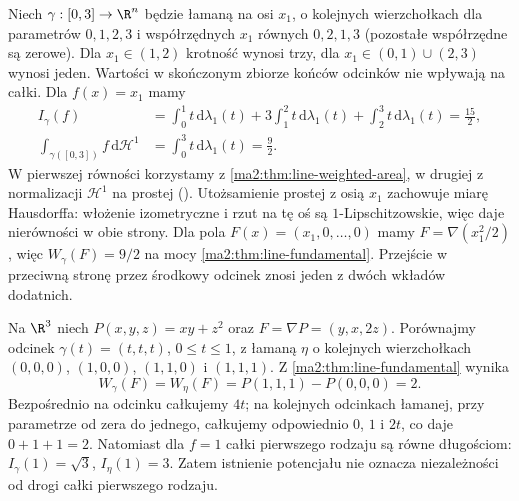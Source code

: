 \begin{przyklad}
\label{ma2:ex:line-partial-repetition}
Niech $\gamma:[0,3]\to\R^n$ będzie łamaną na osi $x_1$,
o kolejnych wierzchołkach dla parametrów $0,1,2,3$
i współrzędnych $x_1$ równych $0,2,1,3$
(pozostałe współrzędne są zerowe).
Dla $x_1\in(1,2)$ krotność wynosi trzy,
dla $x_1\in(0,1)\cup(2,3)$ wynosi jeden.
Wartości w skończonym zbiorze końców odcinków
nie wpływają na całki. Dla $f(x)=x_1$ mamy
\[
 \begin{aligned}
 I_\gamma(f)&=\int_0^1 t\,\mathrm d\lambda_1(t)
 +3\int_1^2 t\,\mathrm d\lambda_1(t)
 +\int_2^3 t\,\mathrm d\lambda_1(t)=\frac{15}{2},\\
 \int_{\gamma([0,3])} f\,\mathrm d\mathcal H^1
 &=\int_0^3 t\,\mathrm d\lambda_1(t)=\frac92.
 \end{aligned}
\]
W pierwszej równości korzystamy z
\ref{ma2:thm:line-weighted-area}, w drugiej
z normalizacji $\mathcal H^1$ na prostej
().
Utożsamienie prostej z osią $x_1$ zachowuje
miarę Hausdorffa: włożenie izometryczne i rzut
na tę oś są $1$-Lipschitzowskie, więc
daje nierówności w obie strony.
Dla pola $F(x)=(x_1,0,\ldots,0)$ mamy
$F=\nabla(x_1^2/2)$, więc
$W_\gamma(F)=9/2$ na mocy
\ref{ma2:thm:line-fundamental}. Przejście
w przeciwną stronę przez środkowy odcinek
znosi jeden z dwóch wkładów dodatnich.
\end{przyklad}

\begin{przyklad}
\label{ma2:ex:line-spatial-potential}
Na $\R^3$ niech $P(x,y,z)=xy+z^2$ oraz
$F=\nabla P=(y,x,2z)$.
Porównajmy odcinek $\gamma(t)=(t,t,t)$,
$0\le t\le1$, z łamaną $\eta$ o kolejnych
wierzchołkach $(0,0,0)$, $(1,0,0)$,
$(1,1,0)$ i $(1,1,1)$.
Z \ref{ma2:thm:line-fundamental} wynika
\[
 W_\gamma(F)=W_\eta(F)=P(1,1,1)-P(0,0,0)=2.
\]
Bezpośrednio na odcinku całkujemy $4t$;
na kolejnych odcinkach łamanej, przy
parametrze od zera do jednego, całkujemy
odpowiednio $0$, $1$ i $2t$, co daje
$0+1+1=2$.
Natomiast dla $f=1$ całki pierwszego rodzaju
są równe długościom: $I_\gamma(1)=\sqrt3$,
$I_\eta(1)=3$.
Zatem istnienie potencjału nie oznacza
niezależności od drogi całki pierwszego rodzaju.
\end{przyklad}

